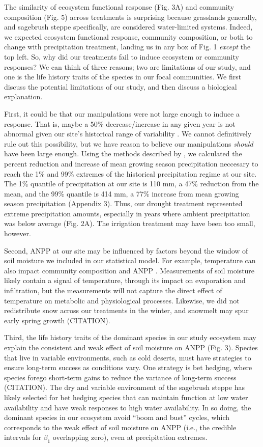 \documentclass[fleqn,10pt,lineno]{wlpeerj} %
\begin{document}
The similarity of ecosystem functional response (Fig. 3A) and community
composition (Fig. 5) across treatments is surprising because grasslands
generally, and sagebrush steppe specifically, are considered
water-limited systems. Indeed, we expected ecosystem functional
response, community composition, or both to change with precipitation
treatment, landing us in any box of Fig. 1 \emph{except} the top left.
So, why did our treatments fail to induce ecosystem or community
responses? We can think of three reasons; two are limitations of our
study, and one is the life history traits of the species in our focal
communities. We first discuss the potential limitations of our study,
and then discuss a biological explanation.

First, it could be that our manipulations were not large enough to
induce a response. That is, maybe a 50\% decrease/increase in any given
year is not abnormal given our site's historical range of variability
\citep{Knapp2017}. We cannot definitively rule out this possibility, but
we have reason to believe our manipulations \emph{should} have been
large enough. Using the methods described by \citet{Lemoine2016}, we
calculated the percent reduction and increase of mean growing season
precipitation neccesary to reach the 1\% and 99\% extremes of the
historical precipitation regime at our site. The 1\% quantile of
precipitation at our site is 110 mm, a 47\% reduction from the mean, and
the 99\% quantile is 414 mm, a 77\% increase from mean growing season
precipitation (Appendix 3). Thus, our drought treatment represented
extreme precipitation amounts, especially in years where ambient
precipitation was below average (Fig. 2A). The irrigation treatment may
have been too small, however.

Second, ANPP at our site may be influenced by factors beyond the window
of soil moisture we included in our statistical model. For example,
temperature can also impact community composition and ANPP
\citep{Hoover2014}. Measurements of soil moisture likely contain a
signal of temperature, through its impact on evaporation and
infiltration, but the measurements will not capture the direct effect of
temperature on metabolic and physiological processes. Likewise, we did
not redistribute snow across our treatments in the winter, and snowmelt
may spur early spring growth (CITATION).

Third, the life history traits of the dominant species in our study
ecosystem may explain the consistent and weak effect of soil moisture on
ANPP (Fig. 3). Species that live in variable environments, such as cold
deserts, must have strategies to ensure long-term success as conditions
vary. One strategy is bet hedging, where species forego short-term gains
to reduce the variance of long-term success (CITATION). The dry and
variable environment of the sagebrush steppe has likely selected for bet
hedging species that can maintain function at low water availability and
have weak responses to high water availability. In so doing, the
dominant species in our ecosystem avoid ``boom and bust'' cycles, which
corresponds to the weak effect of soil moisture on ANPP (i.e., the
credible intervals for \(\beta_1\) overlapping zero), even at
precipitation extremes.
\end{document}
